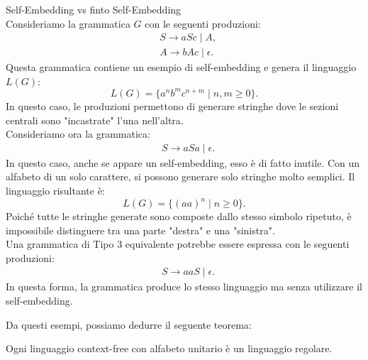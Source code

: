 \documentclass{article}
\begin{document}
\begin{example}
Self-Embedding vs finto Self-Embedding
\\\noindent
Consideriamo la grammatica \( G \) con le seguenti produzioni:
\[
\begin{aligned}
    &S \rightarrow aSc \mid A, \\
    &A \rightarrow bAc \mid \epsilon.
\end{aligned}
\]
Questa grammatica contiene un esempio di self-embedding e genera il linguaggio \( L(G) \):
\[
L(G) = \{ a^n b^m c^{n+m} \mid n, m \geq 0 \}.
\]
In questo caso, le produzioni permettono di generare stringhe dove le sezioni centrali sono "incastrate" l'una nell'altra.
\\
Consideriamo ora la grammatica:
\[
\begin{aligned}
    &S \rightarrow aSa \mid \epsilon.
\end{aligned}
\]
In questo caso, anche se appare un self-embedding, esso è di fatto inutile. Con un alfabeto di un solo carattere, si possono generare solo stringhe molto semplici. Il linguaggio risultante è:
\[
L(G) = \{ (aa)^n \mid n \geq 0 \}.
\]
Poiché tutte le stringhe generate sono composte dallo stesso simbolo ripetuto, è impossibile distinguere tra una parte "destra" e una "sinistra".
\\\noindent
Una grammatica di Tipo 3 equivalente potrebbe essere espressa con le seguenti produzioni:
\[
\begin{aligned}
    &S \rightarrow aaS \mid \epsilon.
\end{aligned}
\]
In questa forma, la grammatica produce lo stesso linguaggio ma senza utilizzare il self-embedding.
\\\noindent
\end{example}
Da questi esempi, possiamo dedurre il seguente teorema:
\\\noindent
\begin{teo}
Ogni linguaggio context-free con alfabeto unitario è  un linguaggio regolare.
\end{teo}
\end{document}
